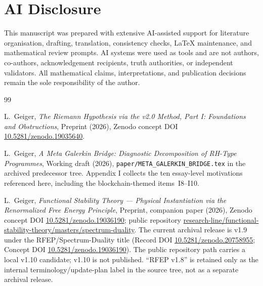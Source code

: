 \documentclass[11pt]{article}
\theoremstyle{definition}
\theoremstyle{remark}
\begin{document}
\section*{AI Disclosure}

This manuscript was prepared with extensive AI-assisted support for
literature organisation, drafting, translation, consistency checks,
LaTeX maintenance, and mathematical review prompts. AI systems were used
as tools and are not authors, co-authors, acknowledgement recipients,
truth authorities, or independent validators. All mathematical claims,
interpretations, and publication decisions remain the sole responsibility
of the author.

\begin{thebibliography}{99}


L.~Geiger, \emph{The Riemann Hypothesis via the v2.0 Method,
Part I: Foundations and Obstructions}, Preprint (2026), Zenodo concept DOI
\href{https://doi.org/10.5281/zenodo.19035640}{10.5281/zenodo.19035640}.

L.~Geiger, \emph{A Meta Galerkin Bridge: Diagnostic Decomposition
of RH-Type Programmes}, Working draft (2026),
\texttt{paper/META\_GALERKIN\_BRIDGE.tex} in the archived predecessor
tree. Appendix I collects
the ten essay-level motivations referenced here, including the
blockchain-themed items~I8--I10.

L.~Geiger, \emph{Functional Stability Theory --- Physical
Instantiation via the Renormalized Free Energy Principle},
Preprint, companion paper (2026), Zenodo concept DOI
\href{https://doi.org/10.5281/zenodo.19036190}{10.5281/zenodo.19036190};
public repository
\href{https://github.com/research-line/functional-stability-theory/tree/main/masters/spectrum-duality}{research-line/functional-stability-theory/masters/spectrum-duality}.
The current archival release is v1.9 under the RFEP/Spectrum-Duality title
(Record DOI
\href{https://doi.org/10.5281/zenodo.20758955}{10.5281/zenodo.20758955};
Concept DOI
\href{https://doi.org/10.5281/zenodo.19036190}{10.5281/zenodo.19036190}).
The public repository path carries a local v1.10 candidate; v1.10 is not
published. ``RFEP v1.8'' is retained only as the internal
terminology/update-plan label in the source tree, not as a separate archival
release.


\end{thebibliography}
\end{document}
